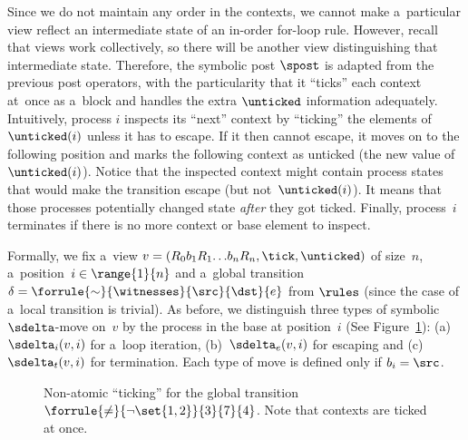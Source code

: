 
Since we do not maintain any order in the contexts, we
cannot %
make a~particular view reflect an intermediate state of an in-order
for-loop rule. However, recall that views work collectively, so there
will be another view distinguishing that intermediate state.
%
Therefore, the symbolic post $\spost$ is adapted from the previous
post operators, with the particularity that it ``ticks'' each context
at~once as a~block and handles the extra $\unticked$ information
adequately.
%
Intuitively, process $i$ inspects its ``next'' context by ``ticking''
the elements of~$\unticked(i)$ unless it has to escape.
%
If it then cannot %
escape, it moves on to the following position and marks the following
context as unticked (the new value of~$\unticked(i)$).
%
Notice that the inspected context might contain process states that
would make the transition escape (but not~$\unticked(i)$). It means
that those processes potentially changed state \emph{after} they got
ticked.
%
Finally, process~$i$ terminates if there is no more context or base
element to inspect.

Formally, we fix a~view $v=(R_0b_1R_1{\ldots}b_nR_n,\tick,\unticked)$
of size~$n$, a~position~$i\in\range{1}{n}$ and a~global transition
$\delta = \forrule{\sim}{\witnesses}{\src}{\dst}{e}$ from $\rules$ %
(since the case of a~local transition is trivial).
%
As before, we distinguish three types of symbolic $\sdelta$-move
on~$v$ by the process in the base at position~$i$ %
(See Figure~\ref{figure:view:non:atomic:ticking}):
%
(a)~$\sdelta_i(v,i)$ for a~loop iteration, %
(b)~$\sdelta_e(v,i)$ for escaping and %
(c)~$\sdelta_t(v,i)$ for termination.
% 
Each type of move is defined only if $b_i = \src$. 

\begingroup
\setlength{\intextsep}{\the\bigskipamount}
\begin{figure}[!h]
  \centering
  \hfill%
  \hfill%
  \caption{Non-atomic ``ticking'' for the global transition
    $\forrule{\neq}{\neg\set{1,2}}{3}{7}{4}$. Note that contexts are
    ticked at once.}
  \label{figure:view:non:atomic:ticking}
\end{figure}
\endgroup


